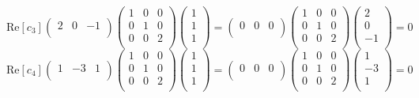 \documentclass[a4paper]{article}
\begin{document}
\begin{ans}
$$\text{Re}[c_3]\begin{pmatrix}2&0&-1\\\end{pmatrix}\begin{pmatrix}1&0&0\\0&1&0\\0&0&2\\\end{pmatrix}\begin{pmatrix}1\\1\\1\\\end{pmatrix}=\begin{pmatrix}0&0&0\\\end{pmatrix}\begin{pmatrix}1&0&0\\0&1&0\\0&0&2\\\end{pmatrix}\begin{pmatrix}2\\0\\-1\\\end{pmatrix}=0$$
$$\text{Re}[c_4]\begin{pmatrix}1&-3&1\\\end{pmatrix}\begin{pmatrix}1&0&0\\0&1&0\\0&0&2\\\end{pmatrix}\begin{pmatrix}1\\1\\1\\\end{pmatrix}=\begin{pmatrix}0&0&0\\\end{pmatrix}\begin{pmatrix}1&0&0\\0&1&0\\0&0&2\\\end{pmatrix}\begin{pmatrix}1\\-3\\1\\\end{pmatrix}=0$$

\end{ans}
\end{document}
